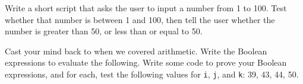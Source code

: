 \begin{Exercise}
Write a short script that asks the user to input a number from 1 to 100. Test whether that number is between 1 and 100, then tell the user whether the number is greater than 50, or less than or equal to 50.
\end{Exercise}
\begin{Exercise}
Cast your mind back to when we covered arithmetic. Write the Boolean expressions to evaluate the following. Write some code to prove your Boolean expressions, and for each, test the following values for \verb|i|, \verb|j|, and \verb|k|: 39, 43, 44, 50.
\end{Exercise}
